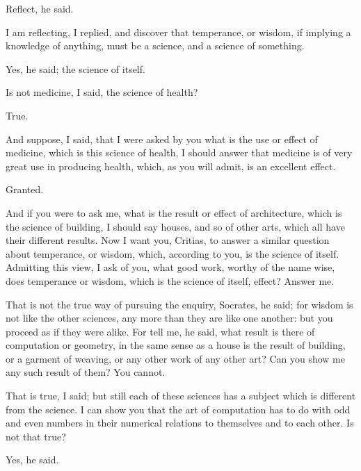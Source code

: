 \documentclass[11pt,letter]{article}
\begin{document}
\par  Reflect, he said.

\par  I am reflecting, I replied, and discover that temperance, or wisdom, if implying a knowledge of anything, must be a science, and a science of something.

\par  Yes, he said; the science of itself.

\par  Is not medicine, I said, the science of health?

\par  True.

\par  And suppose, I said, that I were asked by you what is the use or effect of medicine, which is this science of health, I should answer that medicine is of very great use in producing health, which, as you will admit, is an excellent effect.

\par  Granted.

\par  And if you were to ask me, what is the result or effect of architecture, which is the science of building, I should say houses, and so of other arts, which all have their different results. Now I want you, Critias, to answer a similar question about temperance, or wisdom, which, according to you, is the science of itself. Admitting this view, I ask of you, what good work, worthy of the name wise, does temperance or wisdom, which is the science of itself, effect? Answer me.

\par  That is not the true way of pursuing the enquiry, Socrates, he said; for wisdom is not like the other sciences, any more than they are like one another: but you proceed as if they were alike. For tell me, he said, what result is there of computation or geometry, in the same sense as a house is the result of building, or a garment of weaving, or any other work of any other art? Can you show me any such result of them? You cannot.

\par  That is true, I said; but still each of these sciences has a subject which is different from the science. I can show you that the art of computation has to do with odd and even numbers in their numerical relations to themselves and to each other. Is not that true?

\par  Yes, he said.
\end{document}

